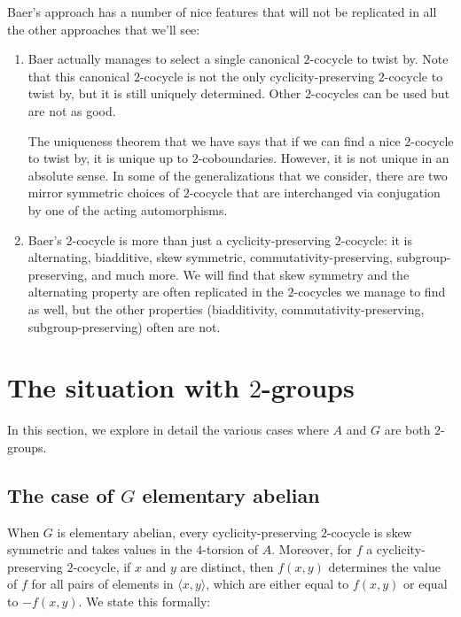 \documentclass[10pt]{amsart}
\begin{document}
Baer's approach has a number of nice features that will not be
replicated in all the other approaches that we'll see:

\begin{enumerate}
\item Baer actually manages to select a single canonical $2$-cocycle
  to twist by. Note that this canonical $2$-cocycle is not the only
  cyclicity-preserving $2$-cocycle to twist by, but it is still
  uniquely determined. Other $2$-cocycles can be used but are not as
  good.

  The uniqueness theorem that we have says that if we can find a nice
  $2$-cocycle to twist by, it is unique up to
  $2$-coboundaries. However, it is not unique in an absolute sense. In
  some of the generalizations that we consider, there are two mirror
  symmetric choices of $2$-cocycle that are interchanged via
  conjugation by one of the acting automorphisms.

\item Baer's $2$-cocycle is more than just a cyclicity-preserving
  $2$-cocycle: it is alternating, biadditive, skew symmetric,
  commutativity-preserving, subgroup-preserving, and much more. We
  will find that skew symmetry and the alternating property are often
  replicated in the $2$-cocycles we manage to find as well, but the
  other properties (biadditivity, commutativity-preserving,
  subgroup-preserving) often are not.
\end{enumerate}


\section{The situation with $2$-groups}

In this section, we explore in detail the various cases where $A$ and
$G$ are both $2$-groups.

\subsection{The case of $G$ elementary abelian}

When $G$ is elementary abelian, every cyclicity-preserving $2$-cocycle
is skew symmetric and takes values in the $4$-torsion of
$A$. Moreover, for $f$ a cyclicity-preserving $2$-cocycle, if $x$ and
$y$ are distinct, then $f(x,y)$ determines the value of $f$ for all
pairs of elements in $\langle x, y \rangle$, which are either equal to
$f(x,y)$ or equal to $-f(x,y)$. We state this formally:
\end{document}
